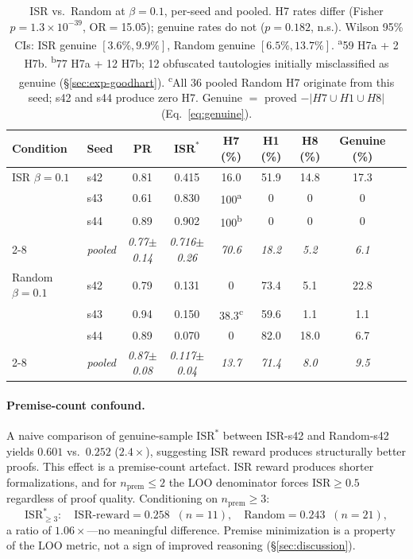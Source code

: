 \begin{table}[t]
\centering\small
\begin{tabular}{llccccccc}
\toprule
\textbf{Condition} & \textbf{Seed} & \textbf{PR} & $\mathbf{ISR}^*$ & \textbf{H7 (\%)} & \textbf{H1 (\%)} & \textbf{H8 (\%)} & \textbf{Genuine (\%)} \\
\midrule
ISR $\beta{=}0.1$    & s42 & 0.81 & 0.415 & 16.0 & 51.9 & 14.8 & 17.3 \\
                      & s43 & 0.61 & 0.830 & 100\textsuperscript{a} & 0 & 0 & 0 \\
                      & s44 & 0.89 & 0.902 & 100\textsuperscript{b} & 0 & 0 & 0 \\
\cmidrule{2-8}
                      & \textit{pooled} & \textit{0.77\small{$\pm$}0.14} & \textit{0.716\small{$\pm$}0.26} & \textit{70.6} & \textit{18.2} & \textit{5.2} & \textit{6.1} \\
\midrule
Random $\beta{=}0.1$ & s42 & 0.79 & 0.131 & 0 & 73.4 & 5.1 & 22.8 \\
                      & s43 & 0.94 & 0.150 & 38.3\textsuperscript{c} & 59.6 & 1.1 & 1.1 \\
                      & s44 & 0.89 & 0.070 & 0 & 82.0 & 18.0 & 6.7 \\
\cmidrule{2-8}
                      & \textit{pooled} & \textit{0.87\small{$\pm$}0.08} & \textit{0.117\small{$\pm$}0.04} & \textit{13.7} & \textit{71.4} & \textit{8.0} & \textit{9.5} \\
\bottomrule
\end{tabular}
\caption{ISR vs.\ Random at $\beta{=}0.1$, per-seed and pooled.
H7 rates differ (Fisher $p = 1.3 \times 10^{-39}$, OR$=$15.05); genuine rates do not ($p = 0.182$, n.s.).
Wilson 95\% CIs: ISR genuine $[3.6\%, 9.9\%]$, Random genuine $[6.5\%, 13.7\%]$.
\textsuperscript{a}59 H7a + 2 H7b.
\textsuperscript{b}77 H7a + 12 H7b; 12 obfuscated tautologies initially misclassified as genuine (\S\ref{sec:exp-goodhart}).
\textsuperscript{c}All 36 pooled Random H7 originate from this seed; s42 and s44 produce zero H7.
Genuine $=$ proved $- |H7 \cup H1 \cup H8|$ (Eq.~\ref{eq:genuine}).}
\label{tab:isr-vs-random}
\end{table}

\paragraph{Premise-count confound.}
A naive comparison of genuine-sample $\mathrm{ISR}^*$ between ISR-s42 and Random-s42 yields $0.601$ vs.\ $0.252$ ($2.4\times$), suggesting ISR reward produces structurally better proofs.
This effect is a premise-count artefact.
ISR reward produces shorter formalizations, and for $n_\mathrm{prem} \leq 2$ the LOO denominator forces $\mathrm{ISR} \geq 0.5$ regardless of proof quality.
Conditioning on $n_\mathrm{prem} \geq 3$:
\[
  \mathrm{ISR}^*_{\geq 3}: \quad \text{ISR-reward}{=}0.258 \;\;(n{=}11), \quad \text{Random}{=}0.243 \;\;(n{=}21),
\]
a ratio of $1.06\times$---no meaningful difference.
Premise minimization is a property of the LOO metric, not a sign of improved reasoning (\S\ref{sec:discussion}).

